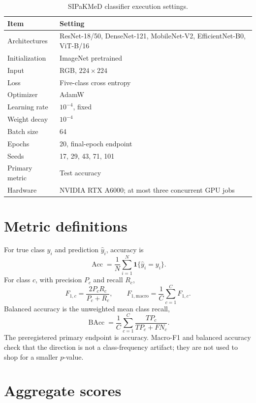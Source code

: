 \documentclass[11pt,oneside]{report}
\begin{document}
\begin{table}[H]
\centering
\caption{SIPaKMeD classifier execution settings.}
\label{tab:classifier-hparams}
\begin{tabular}{ll}
\toprule
Item & Setting \\
\midrule
Architectures & ResNet-18/50, DenseNet-121, MobileNet-V2, EfficientNet-B0, ViT-B/16 \\
Initialization & ImageNet pretrained \\
Input & RGB, $224\times224$ \\
Loss & Five-class cross entropy \\
Optimizer & AdamW \\
Learning rate & $10^{-4}$, fixed \\
Weight decay & $10^{-4}$ \\
Batch size & 64 \\
Epochs & 20, final-epoch endpoint \\
Seeds & 17, 29, 43, 71, 101 \\
Primary metric & Test accuracy \\
Hardware & NVIDIA RTX A6000; at most three concurrent GPU jobs \\
\bottomrule
\end{tabular}
\end{table}

\section{Metric definitions}

For true class $y_i$ and prediction $\hat y_i$, accuracy is
\begin{equation}
\operatorname{Acc}=\frac{1}{N}\sum_{i=1}^{N}\mathbf{1}\{\hat y_i=y_i\}.
\end{equation}
For class $c$, with precision $P_c$ and recall $R_c$,
\begin{equation}
F_{1,c}=\frac{2P_cR_c}{P_c+R_c},\qquad
F_{1,\mathrm{macro}}=\frac{1}{C}\sum_{c=1}^{C}F_{1,c}.
\end{equation}
Balanced accuracy is the unweighted mean class recall,
\begin{equation}
\operatorname{BAcc}=\frac{1}{C}\sum_{c=1}^{C}\frac{TP_c}{TP_c+FN_c}.
\end{equation}
The preregistered primary endpoint is accuracy. Macro-F1 and balanced accuracy check that the direction is not a class-frequency artifact; they are not used to shop for a smaller $p$-value.

\section{Aggregate scores}
\end{document}
